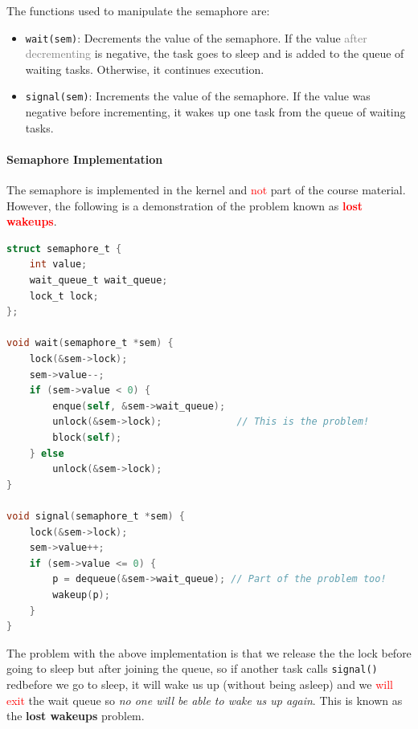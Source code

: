 \documentclass[openany,12pt]{book}
\newcommand{\code}[1]{\texttt{#1}}
\newcommand{\red}[1]{\textcolor{Red}{#1}}
\newcommand{\gray}[1]{\textcolor{gray}{#1}}
\begin{document}
The functions used to manipulate the semaphore are:
\begin{itemize}
  \item \code{wait(sem)}: Decrements the value of the semaphore. If the value \gray{after decrementing} is negative, the task goes to sleep and is added to the queue of waiting tasks. Otherwise, it continues execution.

  \item \code{signal(sem)}: Increments the value of the semaphore. If the value was negative before incrementing, it wakes up one task from the queue of waiting tasks.
\end{itemize}

\paragraph{Semaphore Implementation} The semaphore is implemented in the kernel and \red{not} part of the course material. However, the following is a demonstration of the problem known as \red{\textbf{lost wakeups}}.
\begin{lstlisting}[language=C, caption={Lost Wakeups Problem}, label={lst:lost_wakeups}]
struct semaphore_t {
    int value;                          
    wait_queue_t wait_queue;            
    lock_t lock;                        
};

void wait(semaphore_t *sem) {
    lock(&sem->lock);
    sem->value--; 
    if (sem->value < 0) {
        enque(self, &sem->wait_queue);
        unlock(&sem->lock);             // This is the problem!
        block(self);
    } else 
        unlock(&sem->lock);
}

void signal(semaphore_t *sem) {
    lock(&sem->lock);
    sem->value++;
    if (sem->value <= 0) {
        p = dequeue(&sem->wait_queue); // Part of the problem too!
        wakeup(p);
    }
}
\end{lstlisting}
The problem with the above implementation is that we release the the lock before going to sleep but after joining the queue, so if another task calls \code{signal()} red{before} we go to sleep, it will wake us up (without being asleep) and we \red{will exit} the wait queue so \textit{no one will be able to wake us up again}. This is known as the \textbf{lost wakeups} problem.
\end{document}
